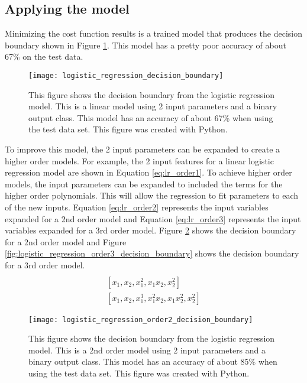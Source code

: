 \subsection{Applying the model}
Minimizing the cost function results is a trained model that produces the decision boundary shown in Figure \ref{fig:logistic_regression_decision_boundary}.  This model has a pretty poor accuracy of about 67\% on the test data.

\begin{figure}
	\centering
	\texttt{[image: logistic\_regression\_decision\_boundary]}
	\decoRule
	\caption{This figure shows the decision boundary from the logistic regression model.  This is a linear model using 2 input parameters and a binary output class.  This model has an accuracy of about 67\% when using the test data set.  This figure was created with Python.}
	\label{fig:logistic_regression_decision_boundary}
\end{figure}

To improve this model, the 2 input parameters can be expanded to create a higher order models.  For example, the 2 input features for a linear logistic regression model are shown in Equation \ref{eq:lr_order1}.  To achieve higher order models, the input parameters can be expanded to included the terms for the higher order polynomials.  This will allow the regression to fit parameters to each of the new inputs.  Equation \ref{eq:lr_order2} represents the input variables expanded for a 2nd order model and Equation \ref{eq:lr_order3} represents the input variables expanded for a 3rd order model.  Figure \ref{fig:logistic_regression_order2_decision_boundary} shows the decision boundary for a 2nd order model and Figure \ref{fig:logistic_regression_order3_decision_boundary} shows the decision boundary for a 3rd order model.
\begin{align}
	[x_1, x_2]  \label{eq:lr_order1} \\
	[x_1, x_2, x_1^2, x_1 x_2, x_2^2] \label{eq:lr_order2} \\
	[x_1, x_2, x_1^3, x_1^2 x_2, x_1 x_2^2, x_2^2] \label{eq:lr_order3}
\end{align}

\begin{figure}
	\centering
	\texttt{[image: logistic\_regression\_order2\_decision\_boundary]}
	\decoRule
	\caption{This figure shows the decision boundary from the logistic regression model.  This is a 2nd order model using 2 input parameters and a binary output class.  This model has an accuracy of about 85\% when using the test data set.  This figure was created with Python.}
	\label{fig:logistic_regression_order2_decision_boundary}
\end{figure}


